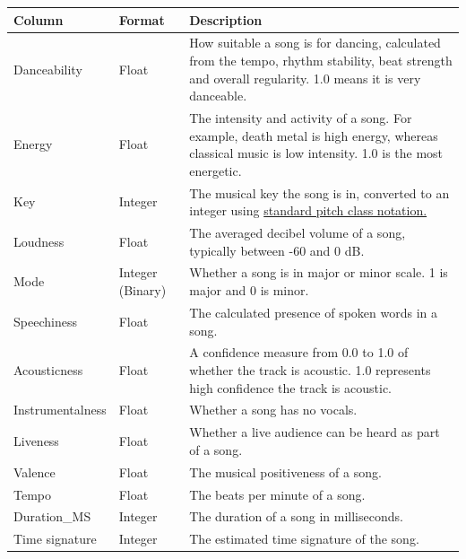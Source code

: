 \documentclass[12pt]{report}
\begin{document}
\begin{table}[H]
    \centering
        \begin{tabular}{ |p{}|p{}| p{}|}
            \hline
            \cellcolor{blue!25}Column & \cellcolor{blue!25}Format & \cellcolor{blue!25}Description\\
            \hline
            Danceability & Float & How suitable a song is for dancing, calculated from the tempo, rhythm stability, beat strength and overall regularity. 1.0 means it is very danceable. \\
            \hline
            Energy & Float & The intensity and activity of a song. For example, death metal is high energy, whereas classical music is low intensity. 1.0 is the most energetic.\\
            \hline
            Key & Integer & The musical key the song is in, converted to an integer using \href{https://smbutterfield.github.io/ibmt17-18/22-intro-to-non-diatonic-materials/b2-tx-pcintnotation.html}{standard pitch class notation.} \\
            \hline
            Loudness & Float & The averaged decibel volume of a song, typically between -60 and 0 dB.\\
            \hline
            Mode & Integer (Binary) & Whether a song is in major or minor scale. 1 is major and 0 is minor.\\
            \hline
            Speechiness & Float & The calculated presence of spoken words in a song.\\
            \hline
            Acousticness & Float & A confidence measure from 0.0 to 1.0 of whether the track is acoustic. 1.0 represents high confidence the track is acoustic.\\
            \hline
            Instrumentalness & Float & Whether a song has no vocals.\\
            \hline
            Liveness & Float & Whether a live audience can be heard as part of a song.\\
            \hline
            Valence & Float & The musical positiveness of a song.\\
            \hline
            Tempo & Float & The beats per minute of a song.\\
            \hline
            Duration\_MS & Integer & The duration of a song in milliseconds.\\
            \hline
            Time signature & Integer & The estimated time signature of the song.\\

\end{tabular}
\end{table}
\end{document}
